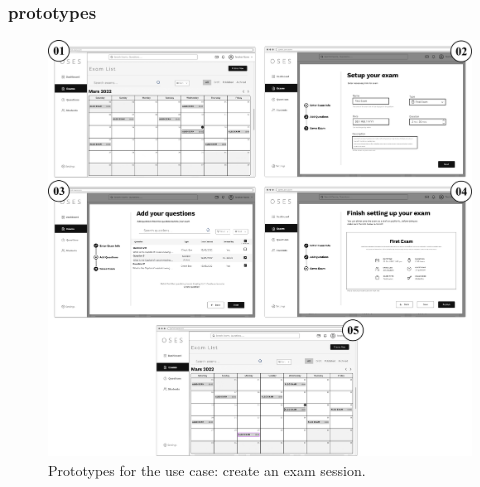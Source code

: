 \documentclass[]{uc2pfecaneva}
\begin{document}
\subsubsection{prototypes}
\begin{figure}[h]
	
	\centering
	\includegraphics[width=\textwidth]{images/prototypes_create_exam_session1}
	
	\caption{Prototypes for the use case: create an exam session.}
\end{figure}
\clearpage
\end{document}
